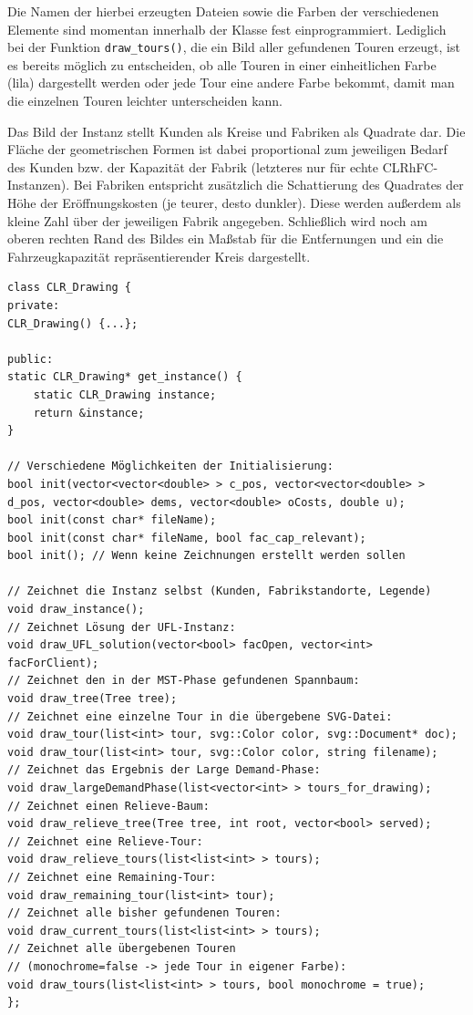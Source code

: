 \documentclass[a4paper,ngerman,11pt,bibtotoc]{scrartcl}
\theoremstyle{definition}
\theoremstyle{plain}
\theoremstyle{remark}
\newcommand{\CLRHFC}{CLRhFC}
\begin{document}
Die Namen der hierbei erzeugten Dateien sowie die Farben der verschiedenen Elemente sind momentan innerhalb der Klasse fest einprogrammiert. Lediglich bei der Funktion \lstinline|draw_tours()|, die ein Bild aller gefundenen Touren erzeugt, ist es bereits möglich zu entscheiden, ob alle Touren in einer einheitlichen Farbe (lila) dargestellt werden oder jede Tour eine andere Farbe bekommt, damit man die einzelnen Touren leichter unterscheiden kann.

Das Bild der Instanz stellt Kunden als Kreise und Fabriken als Quadrate dar. Die Fläche der geometrischen Formen ist dabei proportional zum jeweiligen Bedarf des Kunden bzw. der Kapazität der Fabrik (letzteres nur für echte \CLRHFC-Instanzen). Bei Fabriken entspricht zusätzlich die Schattierung des Quadrates der Höhe der Eröffnungskosten (je teurer, desto dunkler). Diese werden außerdem als kleine Zahl über der jeweiligen Fabrik angegeben. Schließlich wird noch am oberen rechten Rand des Bildes ein Maßstab für die Entfernungen und ein die Fahrzeugkapazität repräsentierender Kreis dargestellt.

\begin{lstlisting}[caption=Die Klasse \lstinline|CLR_Drawing| (gekürzt)]
class CLR_Drawing {
private:
CLR_Drawing() {...};

public:
static CLR_Drawing* get_instance() {
	static CLR_Drawing instance;
	return &instance;
}

// Verschiedene Möglichkeiten der Initialisierung:
bool init(vector<vector<double> > c_pos, vector<vector<double> > 
d_pos, vector<double> dems, vector<double> oCosts, double u);
bool init(const char* fileName);
bool init(const char* fileName, bool fac_cap_relevant);
bool init(); // Wenn keine Zeichnungen erstellt werden sollen

// Zeichnet die Instanz selbst (Kunden, Fabrikstandorte, Legende)
void draw_instance();
// Zeichnet Lösung der UFL-Instanz:
void draw_UFL_solution(vector<bool> facOpen, vector<int> facForClient);
// Zeichnet den in der MST-Phase gefundenen Spannbaum:
void draw_tree(Tree tree);
// Zeichnet eine einzelne Tour in die übergebene SVG-Datei:
void draw_tour(list<int> tour, svg::Color color, svg::Document* doc);
void draw_tour(list<int> tour, svg::Color color, string filename);
// Zeichnet das Ergebnis der Large Demand-Phase:
void draw_largeDemandPhase(list<vector<int> > tours_for_drawing);
// Zeichnet einen Relieve-Baum:
void draw_relieve_tree(Tree tree, int root, vector<bool> served);
// Zeichnet eine Relieve-Tour:
void draw_relieve_tours(list<list<int> > tours);
// Zeichnet eine Remaining-Tour:
void draw_remaining_tour(list<int> tour);
// Zeichnet alle bisher gefundenen Touren:
void draw_current_tours(list<list<int> > tours);
// Zeichnet alle übergebenen Touren
// (monochrome=false -> jede Tour in eigener Farbe):
void draw_tours(list<list<int> > tours, bool monochrome = true);
};
\end{lstlisting}
\end{document}

